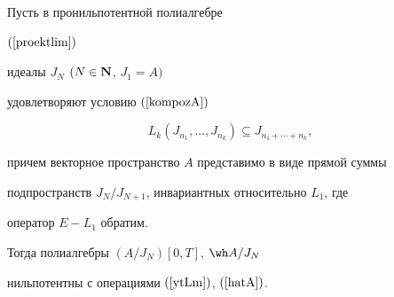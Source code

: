 \begin{lem}


\label{elselemma}


Пусть в пронильпотентной полиалгебре


$(\ref{proektlim})$


идеалы $J_N$ $(N\in{\bold{N}}$, $J_1=A)$


удовлетворяют условию $(\ref{kompozA})$


\begin{equation}


\label{kompozJ}


L_k(J_{n_1},\dotsc,J_{n_k})\subseteq J_{n_1+\dotsb+n_k},


\end{equation}


причем векторное пространство $A$ представимо в виде прямой суммы


подпространств $J_N/J_{N+1}$, инвариантных относительно $L_1$, где


оператор $E-L_1$ обратим.


Тогда полиалгебры $(A/J_N)[0,T]$, $\wh A /J_N$


нильпотентны с операциями $(\ref{ytLm})$, $(\ref{hatA})$.


\end{lem}





